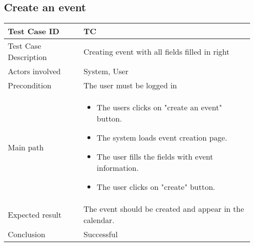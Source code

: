 \newpage
\subsection{Create an event}

\begin{center} \begin{tabular}{|l|l|}
  \hline
  Test Case ID & TC \z\\
  \hline
  Test Case Description & Creating event with all fields filled in right\\
  \hline
  Actors involved & System, User\\
   \hline
  Precondition & The user must be logged in\\
  \hline
  Main path &   \begin{minipage}{5in}
    \vskip 4pt
            \begin{itemize}
              \item The users clicks on "create an event" button.
              \item The system loads event creation page.
              \item The user fills the fields with event information.
              \item The user clicks on "create" button.
            \end{itemize}
    \vskip 4pt
  \end{minipage}  \\
  \hline
  Expected result & The event should be created and appear in the calendar.\\
  \hline
  Conclusion & Successful\\
  \hline
\end{tabular} \end{center}

